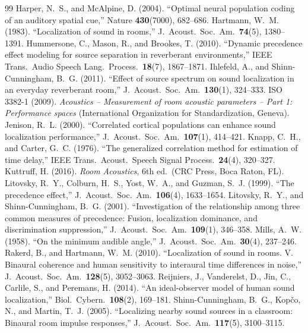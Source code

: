 \documentclass[11pt]{article}
\begin{document}
\begin{thebibliography}{99}
 Harper, N.~S., and McAlpine, D. (2004). ``Optimal neural population coding of an auditory spatial cue,'' Nature \textbf{430}(7000), 682--686.
 Hartmann, W.~M. (1983). ``Localization of sound in rooms,'' J.\ Acoust.\ Soc.\ Am.\ \textbf{74}(5), 1380--1391.
 Hummersone, C., Mason, R., and Brookes, T. (2010). ``Dynamic precedence effect modeling for source separation in reverberant environments,'' IEEE Trans.\ Audio Speech Lang.\ Process.\ \textbf{18}(7), 1867--1871.
 Ihlefeld, A., and Shinn-Cunningham, B.~G. (2011). ``Effect of source spectrum on sound localization in an everyday reverberant room,'' J.\ Acoust.\ Soc.\ Am.\ \textbf{130}(1), 324--333.
 ISO 3382-1 (2009). \emph{Acoustics -- Measurement of room acoustic parameters -- Part 1: Performance spaces} (International Organization for Standardization, Geneva).
 Jenison, R.~L. (2000). ``Correlated cortical populations can enhance sound localization performance,'' J.\ Acoust.\ Soc.\ Am.\ \textbf{107}(1), 414--421.
 Knapp, C.~H., and Carter, G.~C. (1976). ``The generalized correlation method for estimation of time delay,'' IEEE Trans.\ Acoust.\ Speech Signal Process.\ \textbf{24}(4), 320--327.
 Kuttruff, H. (2016). \emph{Room Acoustics}, 6th ed.\ (CRC Press, Boca Raton, FL).
 Litovsky, R.~Y., Colburn, H.~S., Yost, W.~A., and Guzman, S.~J. (1999). ``The precedence effect,'' J.\ Acoust.\ Soc.\ Am.\ \textbf{106}(4), 1633--1654.
 Litovsky, R.~Y., and Shinn-Cunningham, B.~G. (2001). ``Investigation of the relationship among three common measures of precedence: Fusion, localization dominance, and discrimination suppression,'' J.\ Acoust.\ Soc.\ Am.\ \textbf{109}(1), 346--358.
 Mills, A.~W. (1958). ``On the minimum audible angle,'' J.\ Acoust.\ Soc.\ Am.\ \textbf{30}(4), 237--246.
 Rakerd, B., and Hartmann, W.~M. (2010). ``Localization of sound in rooms. V. Binaural coherence and human sensitivity to interaural time differences in noise,'' J.\ Acoust.\ Soc.\ Am.\ \textbf{128}(5), 3052--3063.
 Reijniers, J., Vanderelst, D., Jin, C., Carlile, S., and Peremans, H. (2014). ``An ideal-observer model of human sound localization,'' Biol.\ Cybern.\ \textbf{108}(2), 169--181.
 Shinn-Cunningham, B.~G., Kopčo, N., and Martin, T.~J. (2005). ``Localizing nearby sound sources in a classroom: Binaural room impulse responses,'' J.\ Acoust.\ Soc.\ Am.\ \textbf{117}(5), 3100--3115.
\end{thebibliography}
\end{document}
